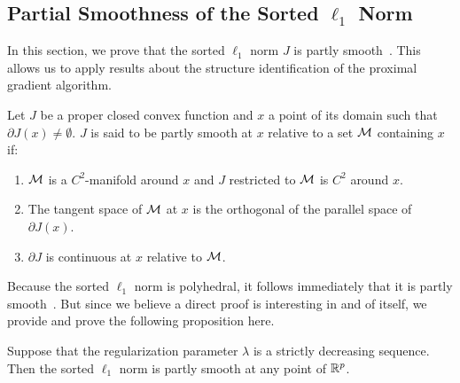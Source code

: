\subsection{Partial Smoothness of the Sorted $\ell_1$ Norm}
\label{app:sec:partly_smooth}

In this section, we prove that the sorted $\ell_1$ norm $J$ is partly smooth~\parencite{lewis2002a}.
This allows us to apply results about the structure identification of the proximal gradient algorithm.

\begin{definition}
	Let $J$ be a proper closed convex function and $x$ a point of its domain such that $\partial J(x) \neq \emptyset$.
	$J$ is said to be partly smooth at $x$ relative to a set $\mathcal{M}$ containing $x$ if:
	\begin{enumerate}
		\item $\mathcal{M}$ is a $C^2$-manifold around $x$ and $J$ restricted to $\mathcal{M}$ is $C^2$ around $x$.
		\item The tangent space of $\mathcal{M}$ at $x$ is the orthogonal of the parallel space of $\partial J(x)$.
		\item $\partial J$ is continuous at $x$ relative to $\mathcal{M}$.
	\end{enumerate}
\end{definition}

Because the sorted \(\ell_1\) norm is polyhedral, it follows immediately that it
is partly smooth~\parencite[Example 18]{vaiter2017}. But since we believe a direct
proof is interesting in and of itself, we provide and prove the following proposition here.

\begin{proposition}
	Suppose that the regularization parameter $\lambda$ is a strictly decreasing sequence. Then the sorted $\ell_1$ norm is partly smooth at any point of $\mathbb{R}^p$.
\end{proposition}


